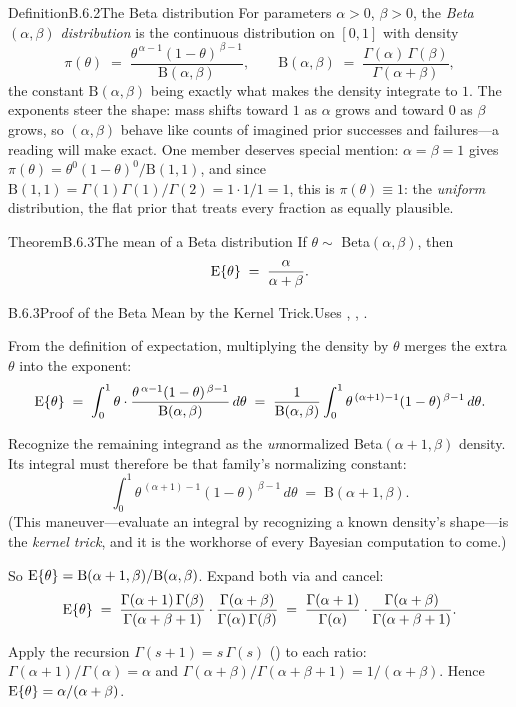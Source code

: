 \documentclass[main.tex]{subfiles}
\begin{document}
\begin{Obj}{Definition}{B.6.2}{The Beta distribution}
For parameters $\alpha>0$, $\beta>0$, the \emph{Beta$(\alpha,\beta)$ distribution} is the
continuous distribution on $[0,1]$ with density
\[ \pi(\theta) \;=\; \frac{\theta^{\,\alpha-1}(1-\theta)^{\,\beta-1}}{\mathrm{B}(\alpha,\beta)} ,
   \qquad
   \mathrm{B}(\alpha,\beta) \;=\; \frac{\Gamma(\alpha)\,\Gamma(\beta)}{\Gamma(\alpha+\beta)} , \]
the constant $\mathrm{B}(\alpha,\beta)$ being exactly what makes the density integrate to
$1$. The exponents steer the shape: mass shifts toward $1$ as $\alpha$ grows and toward $0$
as $\beta$ grows, so $(\alpha,\beta)$ behave like counts of imagined prior successes and
failures---a reading  will make exact. One member deserves special mention:
$\alpha=\beta=1$ gives $\pi(\theta)=\theta^{0}(1-\theta)^{0}/\mathrm{B}(1,1)$, and since
$\mathrm{B}(1,1)=\Gamma(1)\Gamma(1)/\Gamma(2)=1\cdot1/1=1$, this is $\pi(\theta)\equiv1$:
the \emph{uniform} distribution, the flat prior that treats every fraction as equally
plausible.
\end{Obj}

\begin{Obj}{Theorem}{B.6.3}{The mean of a Beta distribution}
If $\theta\sim$ Beta$(\alpha,\beta)$, then
\[ \mathrm{E}\{\theta\} \;=\; \frac{\alpha}{\alpha+\beta} . \]
\end{Obj}
\begin{Prf}{B.6.3}{Proof of the Beta Mean by the Kernel Trick.}{Uses , , .}
\item From the definition of expectation, multiplying the density by $\theta$ merges the
      extra $\theta$ into the exponent:
      \[ \mathrm{E}\{\theta\} \;=\; \int_0^1 \theta\cdot
         \frac{\theta^{\,\alpha-1}(1-\theta)^{\,\beta-1}}{\mathrm{B}(\alpha,\beta)}\,d\theta
         \;=\; \frac{1}{\mathrm{B}(\alpha,\beta)}
         \int_0^1 \theta^{\,(\alpha+1)-1}(1-\theta)^{\,\beta-1}\,d\theta . \]
\item Recognize the remaining integrand as the \emph{un}normalized Beta$(\alpha+1,\beta)$
      density. Its integral must therefore be that family's normalizing constant:
      \[ \int_0^1 \theta^{\,(\alpha+1)-1}(1-\theta)^{\,\beta-1}\,d\theta
         \;=\; \mathrm{B}(\alpha+1,\beta) . \]
      (This maneuver---evaluate an integral by recognizing a known density's shape---is the
      \emph{kernel trick}, and it is the workhorse of every Bayesian computation to come.)
\item So $\mathrm{E}\{\theta\}=\mathrm{B}(\alpha+1,\beta)/\mathrm{B}(\alpha,\beta)$. Expand both
      via  and cancel:
      \[ \mathrm{E}\{\theta\}
         \;=\; \frac{\Gamma(\alpha+1)\,\Gamma(\beta)}{\Gamma(\alpha+\beta+1)}\cdot
               \frac{\Gamma(\alpha+\beta)}{\Gamma(\alpha)\,\Gamma(\beta)}
         \;=\; \frac{\Gamma(\alpha+1)}{\Gamma(\alpha)}\cdot
               \frac{\Gamma(\alpha+\beta)}{\Gamma(\alpha+\beta+1)} . \]
\item Apply the recursion $\Gamma(s+1)=s\,\Gamma(s)$ () to each ratio:
      $\Gamma(\alpha+1)/\Gamma(\alpha)=\alpha$ and
      $\Gamma(\alpha+\beta)/\Gamma(\alpha+\beta+1)=1/(\alpha+\beta)$. Hence
      $\mathrm{E}\{\theta\}=\alpha/(\alpha+\beta)$.
\end{Prf}
\end{document}

